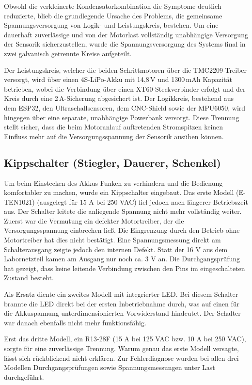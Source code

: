 \documentclass[fontsize=12pt,
parskip=half,	%
department=FakM,  %
logostyle=flat,
twoside, %
DIV=15,BCOR=10mm, %
]{OTHRreprt}
\begin{document}
Obwohl die verkleinerte Kondensatorkombination die Symptome deutlich reduzierte, blieb die grundlegende Ursache des Problems, die gemeinsame Spannungsversorgung von Logik- und Leistungskreis, bestehen. 
Um eine dauerhaft zuverlässige und von der Motorlast vollständig unabhängige Versorgung der Sensorik sicherzustellen, wurde die Spannungsversorgung des Systems final in zwei galvanisch getrennte Kreise aufgeteilt.

Der Leistungskreis, welcher die beiden Schrittmotoren über die TMC2209-Treiber versorgt, wird über einen 4S-LiPo-Akku mit 14,8\,V und 1300\,mAh Kapazität betrieben, wobei die Verbindung über einen XT60-Steckverbinder erfolgt und der Kreis durch eine 2\,A-Sicherung abgesichert ist. 
Der Logikkreis, bestehend aus dem ESP32, den Ultraschallsensoren, dem CNC-Shield sowie der MPU6050, wird hingegen über eine separate, unabhängige Powerbank versorgt. 
Diese Trennung stellt sicher, dass die beim Motoranlauf auftretenden Stromspitzen keinen Einfluss mehr auf die Versorgungsspannung der Sensorik ausüben können. 

\subsection{Kippschalter (Stiegler, Dauerer, Schenkel)}
\label{subsec:kippschalter}

Um beim Einstecken des Akkus Funken zu verhindern und die Bedienung komfortabler zu machen, wurde ein Kippschalter eingebaut. Das erste Modell (E-TEN1021) (ausgelegt für 15 A bei 250 VAC) fiel jedoch nach längerer Betriebszeit aus. Der Schalter leitete die anliegende Spannung nicht mehr vollständig weiter. Zuerst war die Vermutung ein defekter Motortreiber, der die Versorgungsspannung einbrechen ließ. Die Eingrenzung durch den Betrieb ohne Motortreiber hat dies nicht bestätigt. Eine Spannungsmessung direkt am Schalterausgang zeigte jedoch den internen Defekt. Statt der 16 V aus dem Labornetzteil kamen am Ausgang nur noch ca. 3 V an. Die Durchgangsprüfung hat gezeigt, dass keine leitende Verbindung zwischen den Pins im eingeschalteten Zustand besteht.

Als Ersatz diente ein zweites Modell mit integrierter LED. Bei diesem Schalter brannte die LED direkt bei der ersten Inbetriebnahme durch, was auf einen für die Akkuspannung unterdimensionierten Vorwiderstand hindeutet. Der Schalter war danach ebenfalls nicht mehr funktionsfähig.

Erst das dritte Modell, ein R13-28F (15 A bei 125 VAC bzw. 10 A bei 250 VAC), sorgte für eine zuverlässige Trennung. Warum genau das erste Modell versagte, lässt sich rückblickend nicht erklären. Zur Fehlerdiagnose wurden bei allen drei Modellen Durchgangsprüfungen sowie Spannungsmessungen unter Last durchgeführt.
\end{document}
